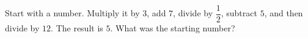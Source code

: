 Start with a number. Multiply it by $3$, add $7$, divide by $\dfrac12$, subtract $5$, and then divide by $12$. The result is $5$. What was the starting number?
